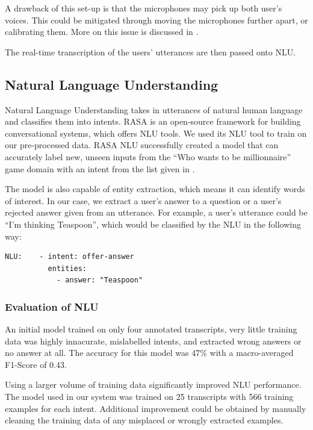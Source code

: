\documentclass[hidelinks, 11pt]{article}
\begin{document}
A drawback of this set-up is that the microphones may pick up both user's voices. This could be mitigated through moving the microphones further apart, or calibrating them. More on this issue is discussed in .

The real-time transcription of the users' utterances are then passed onto NLU.

\subsection{Natural Language Understanding}
\label{subsec:nlu}

Natural Language Understanding takes in utterances of natural human language and classifies them into intents. RASA is an open-source framework for building conversational systems, which offers NLU tools. We used its NLU tool to train on our pre-processed data. RASA NLU successfully created a model that can accurately label new, unseen inputs from the ``Who wants to be millionnaire'' game domain with an intent from the list given in .

The model is also capable of entity extraction, which means it can identify words of interest. In our case, we extract a user's answer to a question or a user's rejected answer given from an utterance. For example, a user's utterance could be ``I'm thinking Teaspoon'', which would be classified by the NLU in the following way:

\begin{verbatim}
NLU:    - intent: offer-answer
          entities:
            - answer: "Teaspoon"
\end{verbatim}

\subsubsection{Evaluation of NLU}
\label{subsec:NLU_evaluation}

An initial model trained on only four annotated transcripts, very little training data was highly innacurate, mislabelled intents, and extracted wrong answers or no answer at all. The accuracy for this model was 47\% with a macro-averaged F1-Score of 0.43.

Using a larger volume of training data significantly improved NLU performance. The model used in our system was trained on 25 transcripts with 566 training examples for each intent. Additional improvement could be obtained by manually cleaning the training data of any misplaced or wrongly extracted examples.
\end{document}
